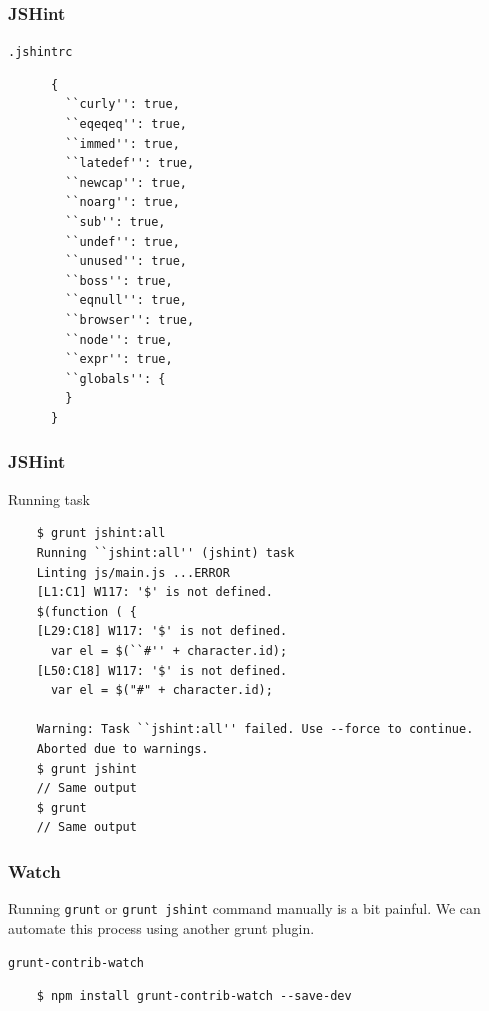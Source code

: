 \begin{frame}[fragile]
  \frametitle{JSHint}
  \begin{block}{\texttt{.jshintrc}}
    {\tiny
    \begin{verbatim}
      {
        ``curly'': true,
        ``eqeqeq'': true,
        ``immed'': true, 
        ``latedef'': true,
        ``newcap'': true,   
        ``noarg'': true,
        ``sub'': true,  
        ``undef'': true,    
        ``unused'': true,
        ``boss'': true,
        ``eqnull'': true,
        ``browser'': true,
        ``node'': true,
        ``expr'': true,
        ``globals'': {
        } 
      }
    \end{verbatim}
    }
  \end{block}
\end{frame}

\begin{frame}[fragile]
  \frametitle{JSHint}
  \begin{block}{Running task}
  {\scriptsize
    \begin{verbatim}
    $ grunt jshint:all
    Running ``jshint:all'' (jshint) task
    Linting js/main.js ...ERROR
    [L1:C1] W117: '$' is not defined.
    $(function ( {
    [L29:C18] W117: '$' is not defined.
      var el = $(``#'' + character.id);
    [L50:C18] W117: '$' is not defined.
      var el = $("#" + character.id);

    Warning: Task ``jshint:all'' failed. Use --force to continue.
    Aborted due to warnings.
    $ grunt jshint
    // Same output
    $ grunt
    // Same output
    \end{verbatim}
  }
  \end{block}
\end{frame}

\begin{frame}[fragile]
  \frametitle{Watch}

  Running \texttt{grunt} or \texttt{grunt jshint} command manually is a bit painful. We can automate this process using another grunt plugin.

  \pause

  \begin{block}{\texttt{grunt-contrib-watch}}
    {\tiny
    \begin{verbatim}
    $ npm install grunt-contrib-watch --save-dev
    \end{verbatim}
    }
  \end{block}
\end{frame}

